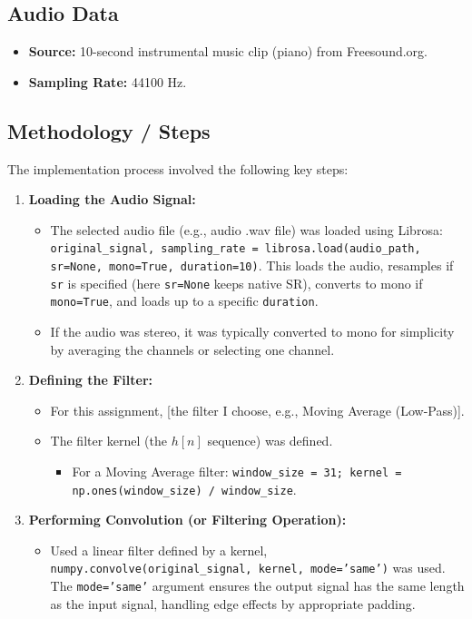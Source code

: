 \documentclass[12pt, a4paper]{article}
\begin{document}
\subsection{Audio Data}
\begin{itemize}
    \item \textbf{Source:} 10-second instrumental music clip (piano) from Freesound.org.
    \item \textbf{Sampling Rate:} 44100 Hz.
\end{itemize}


\subsection{Methodology / Steps}
The implementation process involved the following key steps:

\begin{enumerate}
\item \textbf{Loading the Audio Signal:}
        \begin{itemize}
            \item The selected audio file (e.g., audio .wav file) was loaded using Librosa: \texttt{original\_signal, sampling\_rate = librosa.load(audio\_path, sr=None, mono=True, duration=10)}. This loads the audio, resamples if \texttt{sr} is specified (here \texttt{sr=None} keeps native SR), converts to mono if \texttt{mono=True}, and loads up to a specific \texttt{duration}.
            \item If the audio was stereo, it was typically converted to mono for simplicity by averaging the channels or selecting one channel.
        \end{itemize}

    \item \textbf{Defining the Filter:}
        \begin{itemize}
            \item For this assignment, [the filter I choose, e.g., Moving Average (Low-Pass)].
            \item The filter kernel (the $h[n]$ sequence) was defined.
                \begin{itemize}
                    \item For a Moving Average filter: \texttt{window\_size = 31; kernel = np.ones(window\_size) / window\_size}.
                    \end{itemize}
        \end{itemize}

    \item \textbf{Performing Convolution (or Filtering Operation):}
        \begin{itemize}
            \item Used a linear filter defined by a kernel, \texttt{numpy.convolve(original\_signal, kernel, mode='same')} was used. The \texttt{mode='same'} argument ensures the output signal has the same length as the input signal, handling edge effects by appropriate padding.
           \end{itemize}


\end{enumerate}
\end{document}
